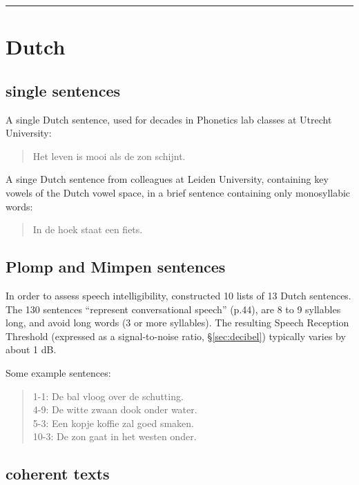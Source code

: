 \documentclass[
]{book}
\begin{document}
\begin{center}\rule{0.5\linewidth}{0.5pt}\end{center}

\section{Dutch}\label{dutch}

\subsection{single sentences}\label{single-sentences}

A single Dutch sentence, used for decades in Phonetics lab classes at Utrecht University:

\begin{quote}
Het leven is mooi als de zon schijnt.
\end{quote}

A singe Dutch sentence from colleagues at Leiden University, containing key vowels of the Dutch vowel space, in a brief sentence containing only monosyllabic words:

\begin{quote}
In de hoek staat een fiets.
\end{quote}

\subsection{Plomp and Mimpen sentences}\label{plomp-and-mimpen-sentences}

In order to assess speech intelligibility, \citet{Plomp_Mimpen_1979} constructed 10 lists of 13 Dutch sentences. The 130 sentences ``represent conversational speech'' (p.44), are 8 to 9 syllables long, and avoid long words (3 or more syllables). The resulting Speech Reception Threshold (expressed as a signal-to-noise ratio, §\ref{sec:decibel}) typically varies by about 1 dB.

Some example sentences:

\begin{quote}
1-1: De bal vloog over de schutting.\\
4-9: De witte zwaan dook onder water.\\
5-3: Een kopje koffie zal goed smaken.\\
10-3: De zon gaat in het westen onder.
\end{quote}

\subsection{coherent texts}\label{coherent-texts}
\end{document}
